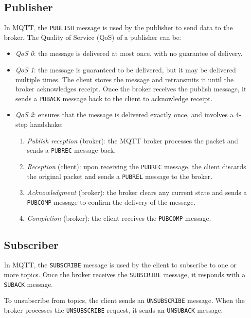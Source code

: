 \subsection{Publisher}
In MQTT, the \texttt{PUBLISH} message is used by the publisher to send data to the broker. 
The Quality of Service (QoS) of a publisher can be: 
\begin{itemize}
    \item \textit{QoS 0}: the message is delivered at most once, with no guarantee of delivery. 
    \item \textit{QoS 1}: the message is guaranteed to be delivered, but it may be delivered multiple times. 
        The client stores the message and retransmits it until the broker acknowledges receipt.
        Once the broker receives the publish message, it sends a \texttt{PUBACK} message back to the client to acknowledge receipt. 
    \item \textit{QoS 2}: ensures that the message is delivered exactly once, and involves a 4-step handshake:
        \begin{enumerate}
            \item \textit{Publish reception} (broker): the MQTT broker processes the packet and sends a \texttt{PUBREC} message back. 
            \item \textit{Reception} (client): upon receiving the \texttt{PUBREC} message, the client discards the original packet and sends a \texttt{PUBREL} message to the broker.
            \item \textit{Acknowledgment} (broker): the broker clears any current state and sends a \texttt{PUBCOMP} message to confirm the delivery of the message.
            \item \textit{Completion} (broker): the client receives the \texttt{PUBCOMP} message.
        \end{enumerate}
\end{itemize}

\subsection{Subscriber}
In MQTT, the \texttt{SUBSCRIBE} message is used by the client to subscribe to one or more topics. 
Once the broker receives the \texttt{SUBSCRIBE} message, it responds with a \texttt{SUBACK} message.

To unsubscribe from topics, the client sends an \texttt{UNSUBSCRIBE} message. 
\noindent When the broker processes the \texttt{UNSUBSCRIBE} request, it sends an \texttt{UNSUBACK} message.

